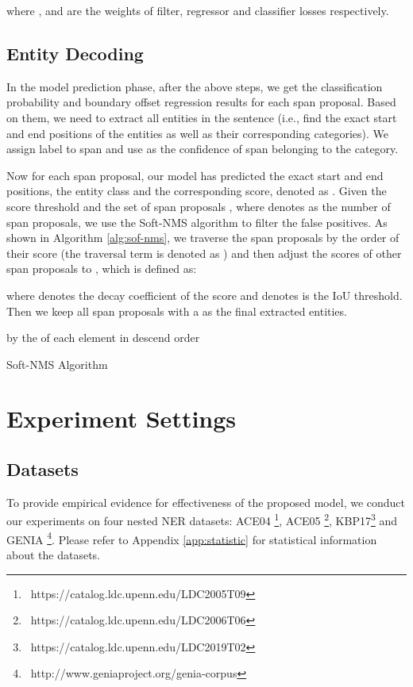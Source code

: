 \documentclass[11pt,a4paper]{article}
\begin{document}
where ,  and  are the weights of filter, regressor and classifier losses respectively.

\subsection{Entity Decoding}

In the model prediction phase, after the above steps, we get the classification probability and boundary offset regression results for each span proposal. Based on them, we need to extract all entities in the sentence (i.e., find the exact start and end positions of the entities as well as their corresponding categories). We assign label  to span  and use  as the confidence of span  belonging to the  category.


Now for each span proposal, our model has predicted the exact start and end positions, the entity class and the corresponding score, denoted as . Given the score threshold  and the set of span proposals  , where  denotes as the number of span proposals, we use the Soft-NMS \citep{8237855} algorithm to filter the false positives. As shown in Algorithm \ref{alg:sof-nms}, we traverse the span proposals by the order of their score 
(the traversal term is denoted as ) and then adjust the scores of other span proposals  to , which is defined as:



\noindent where  denotes the decay coefficient of the score and  denotes is the IoU threshold. Then we keep all span proposals with a  as the final extracted entities.


\begin{algorithm}[]
\KwOut{}
 \;
  by the  of each element in descend order\;


 \caption{Soft-NMS Algorithm}
 \label{alg:sof-nms}
\end{algorithm}


\section{Experiment Settings}
\subsection{Datasets}



To provide empirical evidence for effectiveness of the proposed model, we conduct our experiments on four nested NER datasets: ACE04 \footnote{{\ https://catalog.ldc.upenn.edu/LDC2005T09}}, ACE05 \footnote{{\ https://catalog.ldc.upenn.edu/LDC2006T06}}, KBP17\footnote{{\ https://catalog.ldc.upenn.edu/LDC2019T02}} and GENIA \footnote{{\ http://www.geniaproject.org/genia-corpus}}. Please refer to Appendix \ref{app:statistic} for statistical information  about the datasets.
\end{document}

